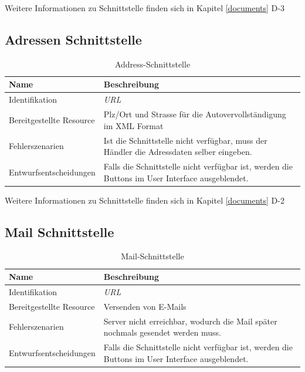 Weitere Informationen zu Schnittstelle finden sich in Kapitel \ref{documents} D-3

\subsection{Adressen Schnittstelle}

\begin{table}[H]
	\centering
	\caption{Address-Schnittstelle}
	\begin{tabular}{  | p{4cm} | p{11cm} |}
		\toprule
		{\textbf{Name}} & {\textbf{Beschreibung}} \\
		\midrule
		Identifikation & \textit{\gls{URL}} \\ \hline
		Bereitgestellte Resource & Plz/Ort und Strasse für die Autovervollständigung im XML Format \\ \hline
		Fehlerszenarien & Ist die Schnittstelle nicht verfügbar, muss der Händler die Adressdaten selber eingeben.\\ \hline
		Entwurfsentscheidungen & Falls die Schnittstelle nicht verfügbar ist, werden die Buttons im User Interface ausgeblendet.\\
		\bottomrule
	\end{tabular}
\end{table}

Weitere Informationen zu Schnittstelle finden sich in Kapitel \ref{documents} D-2

\subsection{Mail Schnittstelle}

\begin{table}[H]
	\centering
	\caption{Mail-Schnittstelle}
	\begin{tabular}{ | p{4cm} | p{11cm} |}
		\toprule
		{\textbf{Name}} & {\textbf{Beschreibung}} \\
		\midrule
		Identifikation & \textit{\gls{URL}} \\ \hline
		Bereitgestellte Resource & Versenden von E-Mails\\ \hline
		Fehlerszenarien & Server nicht erreichbar, wodurch die Mail später nochmals gesendet werden muss.\\ \hline
		Entwurfsentscheidungen & \color {red} {Falls die Schnittstelle nicht verfügbar ist, werden die Buttons im User Interface ausgeblendet}.\\
		\bottomrule
	\end{tabular}
\end{table}

